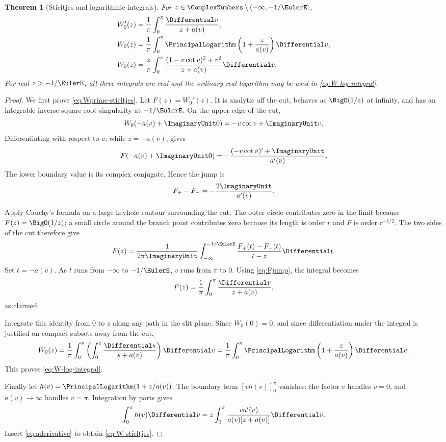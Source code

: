 \documentclass[11pt]{article}
\newtheorem{theorem}{Theorem}[section]
\theoremstyle{remark}
\begin{document}
\begin{theorem}[Stieltjes and logarithmic integrals]\label{thm:stieltjes}
For \(z\in\ComplexNumbers\setminus(-\infty,-1/\EulerE]\),
\begin{align}
 W_0'(z)
 &=\frac1\pi\int_0^\pi\frac{\Differential v}{z+a(v)},\label{eq:Wprime-stieltjes}\\
 W_0(z)
 &=\frac1\pi\int_0^\pi
   \PrincipalLogarithm\left(1+\frac{z}{a(v)}\right)\Differential v,\label{eq:W-log-integral}\\
 W_0(z)
 &=\frac{z}{\pi}\int_0^\pi
 \frac{(1-v\cot v)^2+v^2}{z+a(v)}\Differential v.
 \label{eq:W-stieltjes}
\end{align}
For real \(z>-1/\EulerE\), all three integrals are real and the ordinary real
logarithm may be used in \eqref{eq:W-log-integral}.
\end{theorem}

\begin{proof}
We first prove \eqref{eq:Wprime-stieltjes}.  Let
\(F(z)=W_0'(z)\).  It is analytic off the cut, behaves as
\(\BigO(1/z)\) at infinity, and has an integrable inverse-square-root
singularity at \(-1/\EulerE\).  On the upper edge of the cut,
\[
       W_0(-a(v)+\ImaginaryUnit0)=-v\cot v+\ImaginaryUnit v.
\]
Differentiating with respect to \(v\), while
\(z=-a(v)\), gives
\[
 F(-a(v)+\ImaginaryUnit0)
 =-\frac{(-v\cot v)'+\ImaginaryUnit}{a'(v)}.
\]
The lower boundary value is its complex conjugate.  Hence the jump is
\begin{equation}\label{eq:Fjump}
       F_+-F_-=-\frac{2\ImaginaryUnit}{a'(v)}.
\end{equation}

Apply Cauchy's formula on a large keyhole contour surrounding the cut.
The outer circle contributes zero in the limit because
\(F(z)=\BigO(1/z)\); a small circle around the branch point contributes zero
because its length is order \(r\) and \(F\) is order \(r^{-1/2}\).
The two sides of the cut therefore give
\[
 F(z)=\frac1{2\pi\ImaginaryUnit}
 \int_{-\infty}^{-1/\EulerE}
 \frac{F_+(t)-F_-(t)}{t-z}\Differential t.
\]
Set \(t=-a(v)\).  As \(t\) runs from \(-\infty\) to \(-1/\EulerE\),
\(v\) runs from \(\pi\) to \(0\).  Using \eqref{eq:Fjump}, the integral
becomes
\[
       F(z)=\frac1\pi\int_0^\pi\frac{\Differential v}{z+a(v)},
\]
as claimed.

Integrate this identity from \(0\) to \(z\) along any path in the slit plane.
Since \(W_0(0)=0\), and since differentiation under the integral is justified
on compact subsets away from the cut,
\[
 W_0(z)=\frac1\pi\int_0^\pi
 \left(\int_0^z\frac{\Differential s}{s+a(v)}\right)\Differential v
 =\frac1\pi\int_0^\pi
 \PrincipalLogarithm\left(1+\frac{z}{a(v)}\right)\Differential v.
\]
This proves \eqref{eq:W-log-integral}.

Finally let
\(h(v)=\PrincipalLogarithm(1+z/a(v))\).  The boundary term
\([vh(v)]_0^\pi\) vanishes: the factor \(v\) handles \(v=0\), and
\(a(v)\to\infty\) handles \(v=\pi\).  Integration by parts gives
\[
 \int_0^\pi h(v)\Differential v
 =z\int_0^\pi\frac{v a'(v)}{a(v)[z+a(v)]}\Differential v.
\]
Insert \eqref{eq:aderivative} to obtain \eqref{eq:W-stieltjes}.
\end{proof}
\end{document}
